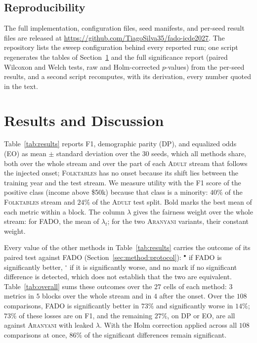 \documentclass[conference]{IEEEtran}
\newcommand{\fado}{\textsc{FADO}}
\newcommand{\ara}{\textsc{Aranyani}}
\newcommand{\adult}{\textsc{Adult}}
\newcommand{\folk}{\textsc{Folktables}}
\begin{document}
\subsection{Reproducibility}
\label{sec:method:reproducibility}
The full implementation, configuration files, seed manifests, and per-seed result files 
are released at \url{https://github.com/TiagoSilva35/fado-icde2027}. The repository lists the sweep configuration
behind every reported run; one script regenerates the tables of Section~\ref{sec:results} and the full significance report (paired
Wilcoxon and Welch tests, raw and Holm-corrected $p$-values) from the per-seed results, and a second script recomputes, with its
derivation, every number quoted in the text.

\section{Results and Discussion}
\label{sec:results}





Table~\ref{tab:results} reports F1, demographic parity (DP), and equalized odds (EO) as mean $\pm$ standard deviation over the $30$ seeds, which all methods
share, both over the whole stream and over the part of each \adult{} stream that follows the injected onset; \folk{} has no onset because its shift lies between the
training year and the test stream. We measure utility with the F1 score of the positive class (income above \$50k) because that class is a minority:
$40\%$ of the \folk{} stream and $24\%$ of the \adult{} test split. Bold marks the best mean of each metric within a block. The column $\lambda$ gives
the fairness weight over the whole stream: for \fado{}, the mean of $\lambda_t$; for the two \ara{} variants, their constant weight.

Every value of the other methods in Table~\ref{tab:results} carries the outcome of its paired test against \fado{} (Section~\ref{sec:method:protocol}): $^{\bullet}$
if \fado{} is significantly better, $^{\circ}$ if it is significantly worse, and no mark if no significant difference is detected, which does not establish that the two
are equivalent. Table~\ref{tab:overall} sums these outcomes over the $27$ cells of each method: $3$ metrics in $5$ blocks over the whole stream and in $4$ after the
onset. Over the $108$ comparisons, \fado{} is significantly better in $73\%$ and significantly worse in $14\%$; $73\%$ of these losses are on F1, and the
remaining $27\%$, on DP or EO, are all against \ara{} with leaked $\lambda$. With the Holm correction applied across all $108$ comparisons at once, $86\%$ of the
significant differences remain significant.
\end{document}
